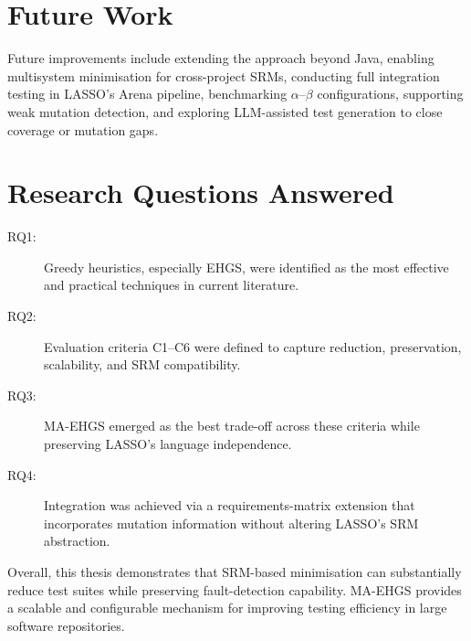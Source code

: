 \section{Future Work}

Future improvements include extending the approach beyond Java, enabling multisystem minimisation for cross-project SRMs, conducting full integration testing in LASSO's Arena pipeline, benchmarking $\alpha$--$\beta$ configurations, supporting weak mutation detection, and exploring LLM-assisted test generation to close coverage or mutation gaps.

\section*{Research Questions Answered}

\begin{description}
  \item[RQ1:] Greedy heuristics, especially EHGS, were identified as the most effective and practical techniques in current literature.
  \item[RQ2:] Evaluation criteria C1--C6 were defined to capture reduction, preservation, scalability, and SRM compatibility.
  \item[RQ3:] MA-EHGS emerged as the best trade-off across these criteria while preserving LASSO's language independence.
  \item[RQ4:] Integration was achieved via a requirements-matrix extension that incorporates mutation information without altering LASSO's SRM abstraction.
\end{description}

Overall, this thesis demonstrates that SRM-based minimisation can substantially reduce test suites while preserving fault-detection capability. MA-EHGS provides a scalable and configurable mechanism for improving testing efficiency in large software repositories.
